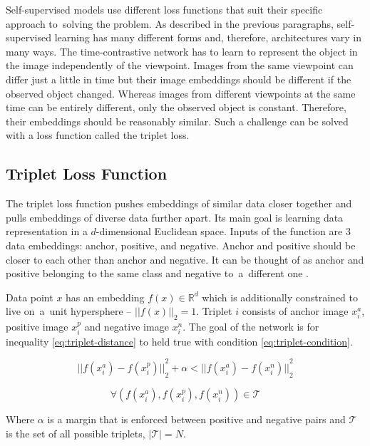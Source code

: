 Self-supervised models use different loss functions that suit their specific approach to~solving the problem. As described in the previous paragraphs, self-supervised learning has many different forms and, therefore, architectures vary in many ways. The time-contrastive network has to learn to represent the object in the image independently of the viewpoint. Images from the same viewpoint can differ just a little in time but their image embeddings should be different if the observed object changed. Whereas images from different viewpoints at the same time can be entirely different, only the observed object is constant. Therefore, their embeddings should be reasonably similar. Such a challenge can be solved with a loss function called the triplet loss.

\subsection{\label{sec:triplet-loss}Triplet Loss Function}

The triplet loss function pushes embeddings of similar data closer together and pulls embeddings of diverse data further apart. Its main goal is learning data representation in a $d$-dimensional Euclidean space. Inputs of the function are 3 data embeddings: anchor, positive, and negative. Anchor and positive should be closer to each other than anchor and negative. It can be thought of as anchor and positive belonging to the same class and negative to~a~different one \cite{facenet-triplet-loss}.

Data point $x$ has an embedding $f(x) \in \mathbb{R}^d$ which is additionally constrained to live on~a~unit hypersphere -- ${|| f(x) ||}_2 = 1$. Triplet $i$ consists of anchor image $x^{a}_{i}$, positive image $x^{p}_{i}$ and negative image $x^{n}_{i}$. The goal of the network is for inequality  \ref{eq:triplet-distance} to held true with condition \ref{eq:triplet-condition}.

\begin{equation}
    \label{eq:triplet-distance}
    {|| f(x^{a}_{i}) - f(x^{p}_{i}) ||}^{2}_{2} + \alpha < {|| f(x^{a}_{i}) - f(x^{n}_{i}) ||}^{2}_{2}
\end{equation}

\begin{equation}
    \label{eq:triplet-condition}
    \forall ( f(x^{a}_{i}), f(x^{p}_{i}), f(x^{n}_{i})) \in \mathcal{T}
\end{equation}

\noindent Where $\alpha$ is a margin that is enforced between positive and negative pairs and $\mathcal{T}$ is the set of all possible triplets, $|\mathcal{T}| = N$.

